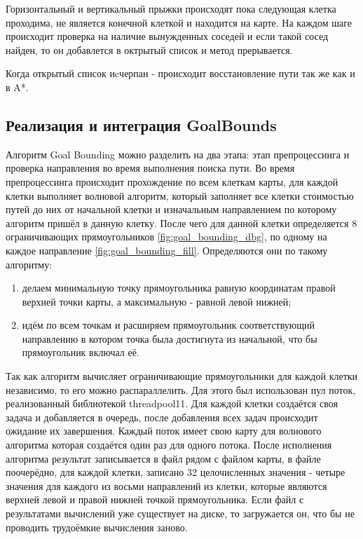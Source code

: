 Горизонтальный и вертикальный прыжки происходят пока следующая клетка проходима, не является конечной клеткой и находится на карте. На каждом шаге происходит проверка на наличие вынужденных соседей и если такой сосед найден, то он добавлется в октрытый список и метод прерывается. 

Когда открытый список иcчерпан - происходит восстановление пути так же как и в A*.

\subsection{Реализация и интеграция GoalBounds}

Алгоритм Goal Bounding можно разделить на два этапа: этап препроцессинга и проверка направления во время выполнения поиска пути. Во время препроцессинга происходит прохождение по всем клеткам карты, для каждой клетки выполняет волновой алгоритм, который заполняет все клетки стоимостью путей до них от начальной клетки и изначальным направлением по которому алгоритм пришёл в данную клетку. После чего для данной клетки определяется 8 ограничивающих прямоугольников \cref{fig:goal_bounding_dbg}, по одному на каждое направление \cref{fig:goal_bounding_fill}. Определяются они по такому алгоритму: 

\begin{enumerate}
	\item делаем минимальную точку прямоугольника равную координатам правой верхней точки карты, а максимальную - равной левой нижней;
	\item идём по всем точкам и расширяем прямоугольник соответствующий направлению в котором точка была достигнута из начальной, что бы прямоугольник включал её. 
\end{enumerate}



Так как алгоритм вычисляет ограничивающие прямоугольники для каждой клетки независимо, то его можно распараллелить. Для этого был использован пул поток, реализованный библиотекой threadpool11. Для каждой клетки создаётся своя задача и добавляется в очередь, после добавления всех задач происходит ожидание их завершения. Каждый поток имеет свою карту для волнового алгоритма которая создаётся один раз для одного потока. После исполнения алгоритма результат записывается в файл рядом с файлом карты, в файле поочерёдно, для каждой клетки, записано 32 целочисленных значения - четыре значения для каждого из восьми направлений из клетки, которые являются верхней левой и правой нижней точкой прямоугольника. Если файл с результатами вычислений уже существует на диске, то загружается он, что бы не проводить трудоёмкие вычисления заново.

